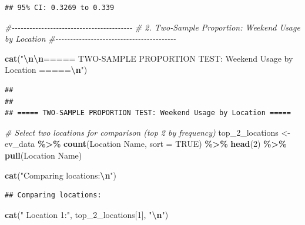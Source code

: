 \documentclass[
  12pt,
]{article}
\newenvironment{Shaded}{\begin{snugshade}}{\end{snugshade}}
\newcommand{\AttributeTok}[1]{\textcolor[rgb]{0.13,0.29,0.53}{#1}}
\newcommand{\CommentTok}[1]{\textcolor[rgb]{0.56,0.35,0.01}{\textit{#1}}}
\newcommand{\ConstantTok}[1]{\textcolor[rgb]{0.56,0.35,0.01}{#1}}
\newcommand{\DecValTok}[1]{\textcolor[rgb]{0.00,0.00,0.81}{#1}}
\newcommand{\FunctionTok}[1]{\textcolor[rgb]{0.13,0.29,0.53}{\textbf{#1}}}
\newcommand{\NormalTok}[1]{#1}
\newcommand{\OtherTok}[1]{\textcolor[rgb]{0.56,0.35,0.01}{#1}}
\newcommand{\SpecialCharTok}[1]{\textcolor[rgb]{0.81,0.36,0.00}{\textbf{#1}}}
\newcommand{\StringTok}[1]{\textcolor[rgb]{0.31,0.60,0.02}{#1}}
\begin{document}
\begin{verbatim}
## 95% CI: 0.3269 to 0.339
\end{verbatim}

\begin{Shaded}
\begin{Highlighting}[]
\CommentTok{\#{-}{-}{-}{-}{-}{-}{-}{-}{-}{-}{-}{-}{-}{-}{-}{-}{-}{-}{-}{-}{-}{-}{-}{-}{-}{-}{-}{-}{-}{-}{-}{-}{-}{-}{-}{-}{-}{-}{-}{-}{-}}
\CommentTok{\# 2. Two{-}Sample Proportion: Weekend Usage by Location}
\CommentTok{\#{-}{-}{-}{-}{-}{-}{-}{-}{-}{-}{-}{-}{-}{-}{-}{-}{-}{-}{-}{-}{-}{-}{-}{-}{-}{-}{-}{-}{-}{-}{-}{-}{-}{-}{-}{-}{-}{-}{-}{-}{-}}

\FunctionTok{cat}\NormalTok{(}\StringTok{"}\SpecialCharTok{\textbackslash{}n\textbackslash{}n}\StringTok{===== TWO{-}SAMPLE PROPORTION TEST: Weekend Usage by Location =====}\SpecialCharTok{\textbackslash{}n}\StringTok{"}\NormalTok{)}
\end{Highlighting}
\end{Shaded}

\begin{verbatim}
## 
## 
## ===== TWO-SAMPLE PROPORTION TEST: Weekend Usage by Location =====
\end{verbatim}

\begin{Shaded}
\begin{Highlighting}[]
\CommentTok{\# Select two locations for comparison (top 2 by frequency)}
\NormalTok{top\_2\_locations }\OtherTok{\textless{}{-}}\NormalTok{ ev\_data }\SpecialCharTok{\%\textgreater{}\%}
    \FunctionTok{count}\NormalTok{(}\StringTok{\textasciigrave{}}\AttributeTok{Location Name}\StringTok{\textasciigrave{}}\NormalTok{, }\AttributeTok{sort =} \ConstantTok{TRUE}\NormalTok{) }\SpecialCharTok{\%\textgreater{}\%}
    \FunctionTok{head}\NormalTok{(}\DecValTok{2}\NormalTok{) }\SpecialCharTok{\%\textgreater{}\%}
    \FunctionTok{pull}\NormalTok{(}\StringTok{\textasciigrave{}}\AttributeTok{Location Name}\StringTok{\textasciigrave{}}\NormalTok{)}

\FunctionTok{cat}\NormalTok{(}\StringTok{"Comparing locations:}\SpecialCharTok{\textbackslash{}n}\StringTok{"}\NormalTok{)}
\end{Highlighting}
\end{Shaded}

\begin{verbatim}
## Comparing locations:
\end{verbatim}

\begin{Shaded}
\begin{Highlighting}[]
\FunctionTok{cat}\NormalTok{(}\StringTok{"  Location 1:"}\NormalTok{, top\_2\_locations[}\DecValTok{1}\NormalTok{], }\StringTok{"}\SpecialCharTok{\textbackslash{}n}\StringTok{"}\NormalTok{)}
\end{Highlighting}
\end{Shaded}
\end{document}
